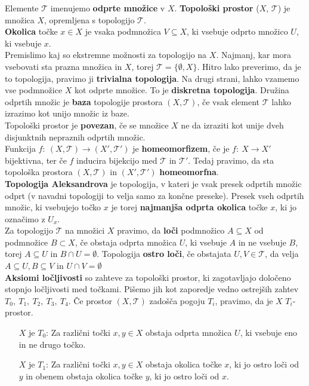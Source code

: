\documentclass[a4paper, 12pt]{book}
\theoremstyle{definition}
\theoremstyle{remark}
\begin{document}
Elemente $\mathcal{T}$ imenujemo \textbf{odprte množice} v $X$. \textbf{Topološki prostor}
($X$, $\mathcal{T}$) je množica $X$, opremljena s topologijo $\mathcal{T}$.\\
\textbf{Okolica} točke $x \in X$ je vsaka podmnožica $V \subseteq X$, ki vsebuje
odprto množico $U$, ki vsebuje $x$.\\
Premislimo kaj so ekstremne možnosti za topologijo na $X$.
Najmanj, kar mora vsebovati sta prazna množica in $X$, torej $\mathcal{T} = \{\emptyset, X\}$. Hitro lako preverimo, da
je to topologija, pravimo ji \textbf{trivialna topologija}. Na drugi strani,
lahko vzamemo vse podmnožice $X$ kot odprte množice. To je \textbf{diskretna topologija}.
Družina odprtih množic je \textbf{baza} topologije prostora $(X,\mathcal{T})$, če 
vsak element $\mathcal{T}$ lahko izrazimo kot unijo množic iz baze.\\
Topološki prostor je \textbf{povezan}, če se množice $X$ ne da izraziti kot unije
dveh disjunktnih nepraznih odprtih množic.\\
Funkcija $f:\ (X,\mathcal{T}) \rightarrow (X',\mathcal{T}')$ je \textbf{homeomorfizem}, če je
$f:\ X \rightarrow X'$ bijektivna, ter če $f$ inducira bijekcijo med $\mathcal{T}$ in $\mathcal{T}'$.
Tedaj pravimo, da sta topološka prostora $(X,\mathcal{T})$ in $(X',\mathcal{T}')$ \textbf{homeomorfna}.\\
\textbf{Topologija Aleksandrova} je topologija, v kateri je vsak presek odprtih
množic odprt (v navadni topologiji to velja samo za končne preseke). Presek vseh odprtih množic, 
ki vsebujejo točko $x$ je torej \textbf{najmanjša odprta okolica} točke $x$, ki jo označimo z $U_x$.\\
Za topologijo $\mathcal{T}$ na množici $X$ pravimo, da \textbf{loči} podmnožico $A \subseteq X$
od podmnožice $B \subset X$, če obstaja odprta množica $U$, ki vsebuje $A$ in ne vsebuje $B$,
torej $A \subseteq U$ in $B \cap U = \emptyset$. Topologija \textbf{ostro loči}, če obstajata
$U,V \in \mathcal{T}$, da velja $A \subseteq U, B \subseteq V$ in $U \cap V = \emptyset$ \\
\textbf{Aksiomi ločljivosti} so zahteve za topološki prostor, ki zagotavljajo določeno
stopnjo ločljivosti med točkami. Pišemo jih kot zaporedje vedno ostrejših zahtev
$T_0,\ T_1,\ T_2,\ T_3,\ T_4$. Če prostor $(X, \mathcal{T})$ zadošča pogoju $T_i$,
pravimo, da je $X$ $T_i$-prostor.

\begin{itemize}
  \item[$X$] je $T_0$: Za različni točki $x,y \in X$ obstaja odprta množica $U$, ki vsebuje
  eno in ne drugo točko.
  \item[$X$] je $T_1$: Za različni točki $x,y \in X$ obstaja okolica točke $x$, ki jo
  ostro loči od $y$ in obenem obstaja okolica točke $y$, ki jo ostro loči od $x$.
\end{itemize}
\end{document}
